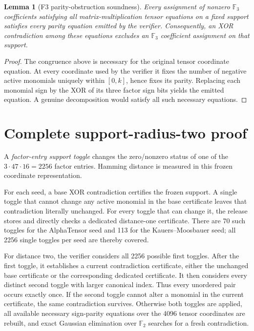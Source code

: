 \documentclass[11pt]{article}
\newtheorem{lemma}{Lemma}
\newcommand{\F}{\mathbb{F}}
\begin{document}
\begin{lemma}[F3 parity-obstruction soundness]
Every assignment of nonzero $\F_3$ coefficients satisfying all matrix-multiplication tensor equations on a fixed support satisfies every parity equation emitted by the verifier. Consequently, an XOR contradiction among these equations excludes an $\F_3$ coefficient assignment on that support.
\end{lemma}
\begin{proof}
The congruence above is necessary for the original tensor coordinate equation. At every coordinate used by the verifier it fixes the number of negative active monomials uniquely within $[0,k]$, hence fixes its parity. Replacing each monomial sign by the XOR of its three factor sign bits yields the emitted equation. A genuine decomposition would satisfy all such necessary equations.
\end{proof}

\section{Complete support-radius-two proof}

A \emph{factor-entry support toggle} changes the zero/nonzero status of one of the $3\cdot47\cdot16=2256$ factor entries. Hamming distance is measured in this frozen coordinate representation.

For each seed, a base XOR contradiction certifies the frozen support. A single toggle that cannot change any active monomial in the base certificate leaves that contradiction literally unchanged. For every toggle that can change it, the release stores and directly checks a dedicated distance-one certificate. There are 70 such toggles for the AlphaTensor seed and 113 for the Kauers--Moosbauer seed; all 2256 single toggles per seed are thereby covered.

For distance two, the verifier considers all 2256 possible first toggles. After the first toggle, it establishes a current contradiction certificate, either the unchanged base certificate or the corresponding dedicated certificate. It then considers every distinct second toggle with larger canonical index. Thus every unordered pair occurs exactly once. If the second toggle cannot alter a monomial in the current certificate, the same contradiction survives. Otherwise both toggles are applied, all available necessary sign-parity equations over the 4096 tensor coordinates are rebuilt, and exact Gaussian elimination over $\F_2$ searches for a fresh contradiction.
\end{document}
